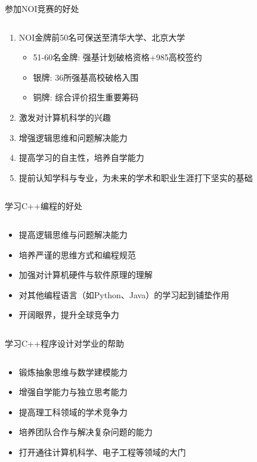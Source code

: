 \documentclass{beamer}
\begin{document}
\begin{frame}[t]{参加NOI竞赛的好处}
\begin{columns}
\begin{spacing}{1.2}
\large
    \begin{enumerate}[label={\arabic*.}]
	\item NOI金牌前50名可保送至清华大学、北京大学
	\begin{itemize}
		\item 51-60名金牌: 强基计划破格资格+985高校签约
        \item 银牌: 36所强基高校破格入围
        \item 铜牌: 综合评价招生重要筹码
    \end{itemize}
    \item 激发对计算机科学的兴趣
    \item 增强逻辑思维和问题解决能力
    \item 提高学习的自主性，培养自学能力
    \item 提前认知学科与专业，为未来的学术和职业生涯打下坚实的基础
    \end{enumerate}
\end{spacing} 
\end{columns}
\end{frame}

\begin{frame}{学习C++编程的好处}
\begin{columns}
\begin{spacing}{1.2}
\large
    \begin{itemize}
        \item 提高逻辑思维与问题解决能力
        \item 培养严谨的思维方式和编程规范
        \item 加强对计算机硬件与软件原理的理解
        \item 对其他编程语言（如Python、Java）的学习起到铺垫作用
        \item 开阔眼界，提升全球竞争力
    \end{itemize}
\end{spacing} 
\end{columns}
\end{frame}

\begin{frame}{学习C++程序设计对学业的帮助}
\begin{columns}
\begin{spacing}{1.2}
\large
    \begin{itemize}
        \item 锻炼抽象思维与数学建模能力
        \item 增强自学能力与独立思考能力
        \item 提高理工科领域的学术竞争力
        \item 培养团队合作与解决复杂问题的能力
        \item 打开通往计算机科学、电子工程等领域的大门
    \end{itemize}
\end{spacing} 
\end{columns}
\end{frame}
\end{document}
